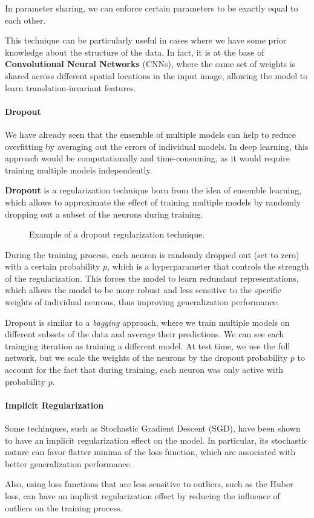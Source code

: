 In parameter sharing, we can enforce certain parameters to be exactly equal to each other.

This technique can be particularly useful in cases where we have some prior knowledge about the structure of the data.
In fact, it is at the base of \textbf{Convolutional Neural Networks} (CNNs), where the same set of weights is shared across different spatial locations in the input image, 
allowing the model to learn translation-invariant features.


\paragraph{Dropout}
We have already seen that the ensemble of multiple models can help to reduce overfitting by averaging out the errors of individual models.
In deep learning, this approach would be computationally and time-consuming, as it would require training multiple models independently.

\textbf{Dropout} is a regularization technique born from the idea of ensemble learning, which allows to approximate the effect of training 
multiple models by randomly dropping out a subset of the neurons during training.
\begin{figure}[H]
    \centering
    
    \caption{Example of a dropout regularization technique.}
    \label{fig:dropout}
\end{figure}
During the training process, each neuron is randomly dropped out (set to zero) with a certain probability $p$, which is a hyperparameter that controls the strength of the regularization.
This forces the model to learn redundant representations, which allows the model to be more robust and less sensitive to the specific weights of individual neurons, 
thus improving generalization performance.

Dropout is similar to a \textit{bagging} approach, where we train multiple models on different subsets of the data and average their predictions.
We can see each trainging iteration as training a different model. At test time, we use the full network, but we scale the weights of the neurons by the dropout probability $p$ to account for the fact that during training, each neuron was only active with probability $p$.
\paragraph{Implicit Regularization}
Some techinques, such as Stochastic Gradient Descent (SGD), have been shown to have an implicit regularization effect on the model.
In particular, its stochastic nature can favor flatter minima of the loss function, which are associated with better generalization performance.

Also, using loss functions that are less sensitive to outliers, such as the Huber loss, can have an implicit regularization effect by reducing the influence of outliers on the training process.